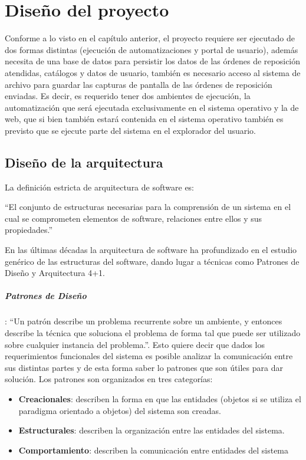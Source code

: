 \chapter{Diseño del proyecto}\label{cap3}
Conforme a lo visto en el capítulo anterior, el proyecto requiere ser ejecutado de dos formas distintas (ejecución de automatizaciones y portal de usuario), además necesita de una base de datos para persistir los datos de las órdenes de reposición atendidas, catálogos y datos de usuario, también es necesario acceso al sistema de archivo para guardar las capturas de pantalla de las órdenes de reposición enviadas. Es decir, es requerido tener dos ambientes de ejecución, la automatización que será ejecutada exclusivamente en el sistema operativo y la de web, que si bien también estará contenida en el sistema operativo también es previsto que se ejecute parte del sistema en el explorador del usuario.




\section{Diseño de la arquitectura}
La definición estricta de arquitectura de software es:
\begin{center}
	``El conjunto de estructuras necesarias para la comprensión de un sistema en el cual se comprometen elementos de software, relaciones entre ellos y sus propiedades.''\cite{SWEBOOK}
\end{center}
En las últimas décadas la arquitectura de software ha profundizado en el estudio genérico de las estructuras del software, dando lugar a técnicas como Patrones de Diseño y Arquitectura 4+1.\\
\paragraph{Patrones de Diseño}: ``Un patrón describe un problema recurrente sobre un ambiente, y entonces describe la técnica que soluciona el problema de forma tal que puede ser utilizado sobre cualquier instancia del problema.''\cite{DesignPatterns}. Esto quiere decir que dados los requerimientos funcionales del sistema es posible analizar la comunicación entre sus distintas partes y de esta forma saber lo patrones que son útiles para dar solución. Los patrones son organizados en tres categorías:
\begin{itemize}
	\item \textbf{Creacionales}: describen la forma en que las entidades (objetos si se utiliza el paradigma orientado a objetos) del sistema son creadas.
	\item \textbf{Estructurales}: describen la organización entre las entidades del sistema.
	\item \textbf{Comportamiento}: describen la comunicación entre entidades del sistema
\end{itemize}
